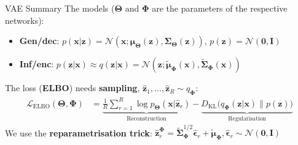 \documentclass{beamer}
\newcommand{\MN}{{\mathcal N}}
\newcommand{\bs}[1]{\boldsymbol{#1}}
\begin{document}
\begin{frame}{VAE Summary}
 The models ($\bs{\Theta}$ and $\bs{\Phi}$ are the parameters of the respective networks):
\begin{itemize}
\item \textbf{Gen/dec}: $p(\bs{x}|\bs{z})=\MN(\bs{x};\bs{\mu}_{\bs{\Theta}}(\bs{z}),\bs{\Sigma}_{\bs{\Theta}}(\bs{z}))$, $p(\bs{z})=\mathcal{N}(\bs{0},\bs{I})$
\item \textbf{Inf/enc}: $p(\bs{z}|\bs{x})\approx q(\bs{z}|\bs{x}) = \MN(\bs{z};\tilde{\bs{\mu}}_{\bs{\Phi}}(\bs{x}),\tilde{\bs{\Sigma}}_{\bs{\Phi}}(\bs{x}))$
\end{itemize}\vspace{3mm}

The loss (\textbf{ELBO}) needs \textbf{sampling}, $\hat{\bs{z}}_1,\ldots,\hat{\bs{z}}_R \sim q_{\bs{\Phi}}$:
\begin{align}
  \mathcal{L}_{\text{ELBO}}(\bs{\Theta},\bs{\Phi}) &= \underbrace{\frac{1}{R}\sum_{r=1}^R\log p_{\bs{\Theta}}(\bs{x}|\hat{\bs{z}}_r)}_{\text{Reconstruction}} -  \underbrace{D_{\text{KL}}\Big(q_{\bs{\Phi}}(\bs{z}|\bs{x})\Big\lVert p(\bs{z})\Big)}_{\text{Regularisation}}
\end{align}
 We use the \textbf{reparametrisation trick}: $\hat{\bs{z}}_r^{\bs{\Phi}} = \tilde{\bs{\Sigma}}_{\bs{\Phi}}^{1/2}\hat{\bs{\epsilon}}_r + \tilde{\bs{\mu}}_{\bs{\Phi}}, \hat{\bs{\epsilon}}_r\sim \MN(\bs{0},\bs{I})$\vspace{3mm}
\end{frame}
\end{document}
